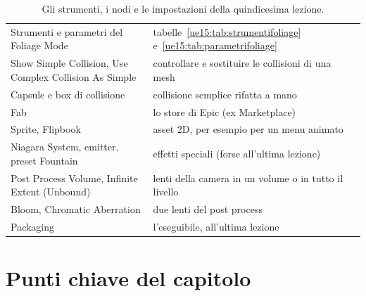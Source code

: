 \begin{table}[htbp]
\begin{tabular}{@{}p{5.8cm}p{8.2cm}@{}}
Strumenti e parametri del Foliage Mode & tabelle~\ref{ue15:tab:strumentifoliage}
e~\ref{ue15:tab:parametrifoliage} \\
Show Simple Collision, Use Complex Collision As Simple & controllare e sostituire le
collisioni di una mesh \\
Capsule e box di collisione & collisione semplice rifatta a mano \\
Fab & lo store di Epic (ex Marketplace) \\
Sprite, Flipbook & asset 2D, per esempio per un menu animato \\
Niagara System, emitter, preset Fountain & effetti speciali (forse all'ultima lezione) \\
Post Process Volume, Infinite Extent (Unbound) & lenti della camera in un volume o in
tutto il livello \\
Bloom, Chromatic Aberration & due lenti del post process \\
Packaging & l'eseguibile, all'ultima lezione \\
\bottomrule
\end{tabular}
\caption{Gli strumenti, i nodi e le impostazioni della quindicesima lezione.}
\label{ue15:tab:strumenti}
\end{table}

\section*{Punti chiave del capitolo}

